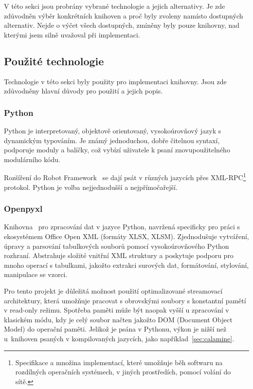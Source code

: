 V této sekci jsou probrány vybrané technologie a jejich alternativy. Je zde zdůvodněn výběr konkrétních knihoven a proč byly zvoleny namísto dostupných alternativ. Nejde o výčet všech dostupných, zmíněny byly pouze knihovny, nad kterými jsem silně uvažoval při implementaci.

\subsection{Použité technologie}

Technologie v této sekci byly použity pro implementaci knihovny. Jsou zde zdůvodněny hlavní důvody pro použití a jejich popis.

\subsubsection{Python}

Python je interpretovaný, objektově orientovaný, vysokoúrovňový jazyk s dynamickým typováním. Je známý jednoduchou, dobře čitelnou syntaxí, podporuje moduly a balíčky, což vybízí uživatele k psaní znovupoužitelného modulárního kódu.~\cite{WhyPython}

Rozšíření do Robot Framework~\cite{robotframeworkUserGuide} se dají psát v různých jazycích přes XML-RPC\footnote{Specifikace a množina implementací, které umožňuje běh softwaru na rozdílných operačních systémech, v jiných prostředích, pomocí volání do sítě.} protokol. Python je volba nejjednodušší a nejpřímočařejší.

\subsubsection{Openpyxl}

Knihovna~\cite{Openpyxl} pro zpracování dat v jazyce Python, navržená specificky pro práci s ekosystémem Office Open XML (formáty XLSX, XLSM). Zjednodušuje vytváření, úpravy a parsování tabulkových souborů pomocí vysokoúrovňového Python rozhraní. Abstrahuje složité vnitřní XML struktury a poskytuje podporu pro mnoho operací s tabulkami, jakožto extrakci surových dat, formátování, stylování, manipulace se vzorci.

Pro tento projekt je důležitá možnost použití optimalizované streamovací architektury, která umožňuje pracovat s obrovskými soubory s konstantní pamětí v read-only režimu. Spotřeba paměti může být naopak vyšší u zpracování v klasickém módu, kdy je celý soubor načten jakožto DOM (Document Object Model) do operační paměti. Jelikož je psána v Pythonu, výkon je nižší než u~knihoven psaných v kompilovaných jazycích, jako například~\ref{sec:calamine}.


